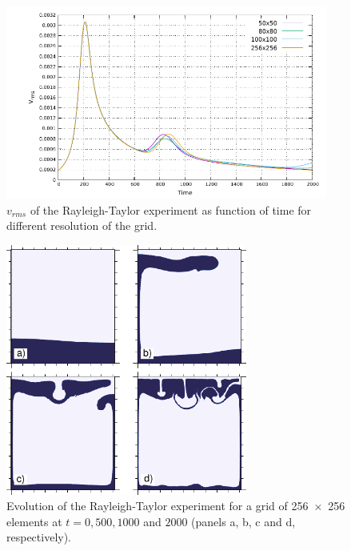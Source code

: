 \documentclass[hidelinks,11pt,a4paper]{article}
\begin{document}
\begin{figure}
\centering
\noindent\includegraphics[width=400px]{./Figures/RT.pdf}
\caption{$v_{rms}$ of the Rayleigh-Taylor experiment as function of time for different resolution of the grid.}
\label{fig:RT}
\end{figure}

\begin{figure}
\centering
\noindent\includegraphics[width=300px]{./Figures/Rayleigh.pdf}
\caption{Evolution of the Rayleigh-Taylor experiment for a grid of \num{256x256} elements at $t=0, 500, 1000$ and $2000$ (panels a, b, c and d, respectively).}
\label{fig:rayleigh}
\end{figure}
\end{document}
